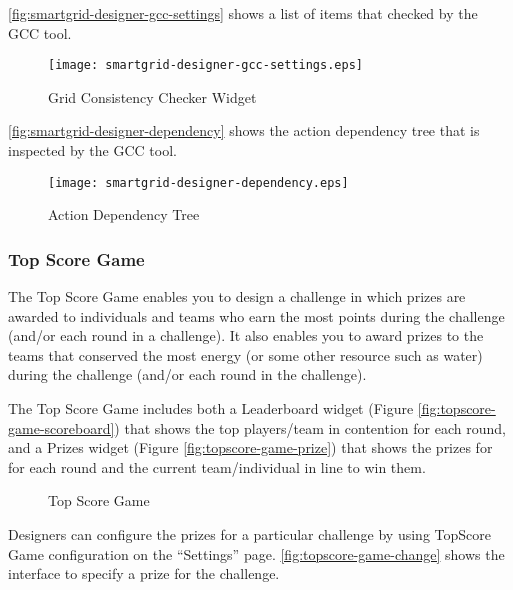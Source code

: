 \autoref{fig:smartgrid-designer-gcc-settings} shows a list of items that checked by the GCC tool. 

\begin{figure}[ht!]
  \center
  \texttt{[image: smartgrid-designer-gcc-settings.eps]}
  \caption{Grid Consistency Checker Widget}
  \label{fig:smartgrid-designer-gcc-settings}
\end{figure}

\autoref{fig:smartgrid-designer-dependency} shows the action dependency tree that is inspected by the GCC tool. 

 \begin{figure}[ht!]
  \center
  \texttt{[image: smartgrid-designer-dependency.eps]}
  \caption{Action Dependency Tree}
  \label{fig:smartgrid-designer-dependency}
\end{figure}

\clearpage

\subsubsection{Top Score Game}

The Top Score Game enables you to design a challenge in which prizes are awarded to individuals and teams who earn the most points during the challenge (and/or each round in a challenge). It also enables you to award prizes to the teams that conserved the most energy (or some other resource such as water) during the challenge (and/or each round in the challenge).

The Top Score Game includes both a Leaderboard widget (Figure \autoref{fig:topscore-game-scoreboard}) that shows the top players/team in contention for each round, and a Prizes widget (Figure \autoref{fig:topscore-game-prize}) that shows the prizes for for each round and the current team/individual in line to win them.

\begin{figure}[ht!]
	\centering
		\caption{Top Score Game}
		\label{fig:topscore-game}
\end{figure}

\clearpage

Designers can configure the prizes for a particular challenge by using TopScore Game configuration on the ``Settings'' page. \autoref{fig:topscore-game-change} shows the interface to specify a prize for the challenge.

